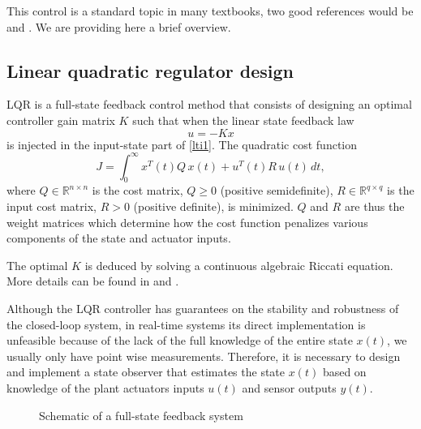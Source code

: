 \documentclass[12pt,lot, lof]{puthesis}
\begin{document}
This control is a standard topic in many textbooks, two good references would be \cite{SandP} and \cite{AandM}. We are providing here a brief overview.

\subsection{ Linear quadratic regulator design}

LQR is a full-state feedback control method that consists of designing an optimal controller gain matrix $K$ such that when the linear state feedback law
\begin{equation}
\label{ltilqr}
u=-K x
\end{equation}
is injected in the input-state part of \eqref{lti1}. The quadratic cost function
\begin{equation}
J = \int_0^{\infty} x^T(t) Q \, x(t) + u^T(t) R \, u(t) \, dt,
\end{equation}
where $Q \in \mathbb{R}^{n \times n}$ is the cost matrix, $Q \ge 0$ (positive semidefinite), $R \in \mathbb{R}^{q \times q}$ is the input cost matrix, $R > 0$ (positive definite), is minimized.
$Q$ and $R$ are thus the weight matrices which determine how the cost function penalizes various components of the state and actuator inputs.

The optimal $K$ is deduced by solving a continuous algebraic Riccati equation. More details can be found in \cite{SandP} and \cite{AandM}.

Although the LQR controller has guarantees on the stability and robustness of the closed-loop system, in real-time systems its direct implementation is unfeasible because of the lack of the full knowledge of the entire state $x(t)$, we usually only have point wise measurements. Therefore, it is necessary to design and implement a state observer that estimates the state $x(t)$ based on knowledge of the plant actuators inputs $u(t)$ and sensor outputs $y(t)$.

\begin{figure}[htbp]
  \centering
  \caption{Schematic of a full-state feedback system}
\end{figure}
\end{document}

